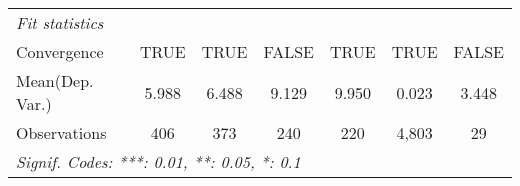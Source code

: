 \begin{tabular}{lcccccc}
   \midrule
   \emph{Fit statistics}\\
   Convergence                           &TRUE         & TRUE        & FALSE       & TRUE        & TRUE  & FALSE\\  
Mean(Dep. Var.) & 5.988 & 6.488 & 9.129 & 9.950 & 0.023 & 3.448 \\
   Observations                          & 406         & 373         & 240         & 220         & 4,803 & 29\\  
   \midrule \midrule
   \multicolumn{7}{l}{\emph{Signif. Codes: ***: 0.01, **: 0.05, *: 0.1}}\\
\end{tabular}
\par\endgroup
